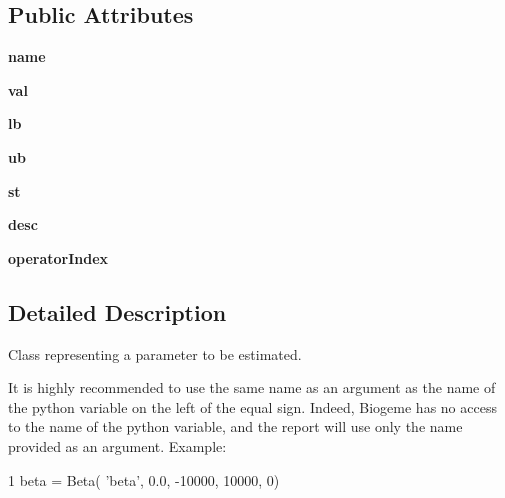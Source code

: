 \subsection*{Public Attributes}
\begin{DoxyCompactItemize}
\item 
{\bfseries name}\hypertarget{classbio__expression_1_1_beta_ae40aca026321dc4873216baea65c209a}{}\label{classbio__expression_1_1_beta_ae40aca026321dc4873216baea65c209a}

\item 
{\bfseries val}\hypertarget{classbio__expression_1_1_beta_af9ff8e36aac16ad655894d20003fb8af}{}\label{classbio__expression_1_1_beta_af9ff8e36aac16ad655894d20003fb8af}

\item 
{\bfseries lb}\hypertarget{classbio__expression_1_1_beta_a7709223a6780122c4dd1f17516b53f5c}{}\label{classbio__expression_1_1_beta_a7709223a6780122c4dd1f17516b53f5c}

\item 
{\bfseries ub}\hypertarget{classbio__expression_1_1_beta_a0923a6e1480c5747a7eecae9a23ca6ad}{}\label{classbio__expression_1_1_beta_a0923a6e1480c5747a7eecae9a23ca6ad}

\item 
{\bfseries st}\hypertarget{classbio__expression_1_1_beta_a7789b899e6f1bb2186387f234f48ca30}{}\label{classbio__expression_1_1_beta_a7789b899e6f1bb2186387f234f48ca30}

\item 
{\bfseries desc}\hypertarget{classbio__expression_1_1_beta_aad1a82e31c5f2389dfac1e4358265ea4}{}\label{classbio__expression_1_1_beta_aad1a82e31c5f2389dfac1e4358265ea4}

\item 
{\bfseries operator\+Index}\hypertarget{classbio__expression_1_1_beta_a7435b0e78fc4790d737438a508dda221}{}\label{classbio__expression_1_1_beta_a7435b0e78fc4790d737438a508dda221}

\end{DoxyCompactItemize}


\subsection{Detailed Description}
Class representing a parameter to be estimated. 

It is highly recommended to use the same name as an argument as the name of the python variable on the left of the equal sign. Indeed, Biogeme has no access to the name of the python variable, and the report will use only the name provided as an argument. Example\+: 
\begin{DoxyCode}
1 beta = Beta( \textcolor{stringliteral}{'beta'}, 0.0, -10000, 10000, 0)
\end{DoxyCode}
 

